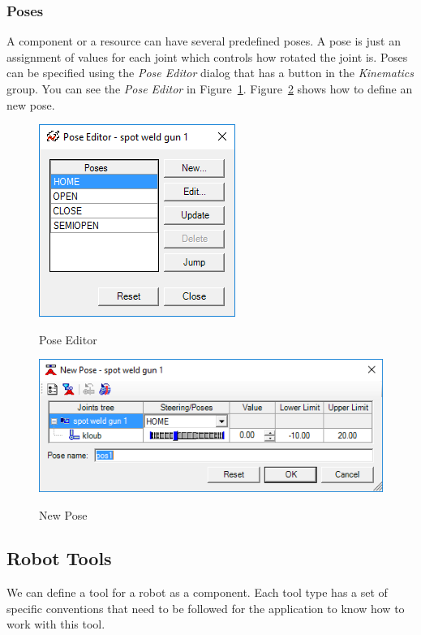 \subsubsection{Poses}
A component or a resource can have several predefined poses. 
A pose is just an assignment of values for each joint which controls how rotated the joint is. 
Poses can be specified using the \emph{Pose Editor} dialog that has a button in the \emph{Kinematics} group. You can see the \emph{Pose Editor} in Figure~\ref{fig:PoseEditor}. Figure~\ref{fig:NewPose} shows how to define an new pose.\\

\begin{figure}[H]
    \caption{Pose Editor}
    \centering
    \includegraphics{pose_editor}
    \label{fig:PoseEditor}
\end{figure}
\begin{figure}[H]
    \caption{New Pose}
    \centering
    \includegraphics{new_pose}
    \label{fig:NewPose}
\end{figure}

\subsection{Robot Tools}
We can define a tool for a robot as a component.
Each tool type has a set of specific conventions that need to be followed for the application to know how to work with this tool. \\

